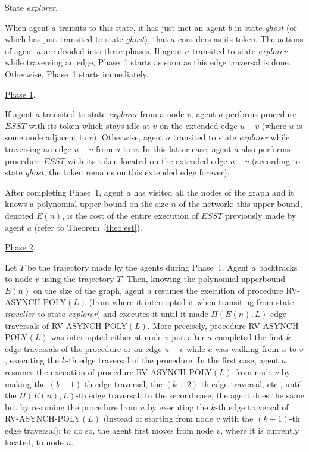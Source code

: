 \documentclass [11pt] {article}
\begin{document}
\noindent
State {\em explorer}.

{When agent $a$ transits to this state, it has just met an agent $b$ in state {\em ghost} (or which has just transited to state {\em ghost}), that $a$ considers as its token.
The actions of agent $a$ are divided into three phases. If agent $a$ transited to state {\em explorer} while traversing an edge, Phase~1 starts as soon as this edge traversal is done. Otherwise, Phase~1 starts immediately.}

\noindent \underline{Phase 1}.

{If agent $a$ transited to state {\em explorer} from a node $v$, agent $a$ performs procedure $ESST$ with its token which stays idle at $v$ on the extended edge $u-v$ (where $u$ is some node adjacent to $v$). Otherwise, agent $a$ transited to state {\em explorer} while traversing an edge $u-v$ from $u$ to $v$. In this latter case, agent $a$ also performs procedure $ESST$ with its token located on the extended edge $u-v$ (according to state {\em ghost}, the token remains on this extended edge forever)}.

{After completing Phase~1, agent $a$ has visited all the nodes of the graph and it knows a polynomial upper bound on the size $n$ of the network: this upper bound, denoted $E(n)$, is the cost of the entire execution of $ESST$ previously made by agent $a$ (refer to Theorem~\ref{theo:est}).} 

\noindent  \underline{Phase 2}.



{Let $T$ be the trajectory made by the agents during Phase~1. Agent $a$ backtracks to node $v$ using the trajectory $\overline{T}$. Then, knowing the polynomial upperbound $E(n)$ on the size of the graph, agent $a$ resumes the execution of procedure RV-ASYNCH-POLY$(L)$ (from where it interrupted it when transiting from state {\em traveller} to state {\em explorer}) and executes it until it made $\Pi(E(n),L)$ edge traversals of RV-ASYNCH-POLY$(L)$. More precisely, procedure RV-ASYNCH-POLY$(L)$ was interrupted either at node $v$ just after $a$ completed the first $k$ edge traversals of the procedure or on edge $u-v$ while $a$ was walking from $u$ to $v$, executing the $k$-th edge traversal of the procedure. In the first case, agent $a$ resumes the execution of procedure RV-ASYNCH-POLY$(L)$ from node $v$ by making the $(k+1)$-th edge traversal, the $(k+2)$-th edge traversal, etc., until the $\Pi(E(n),L)$-th edge traversal. In the second case, the agent does the same but by resuming the procedure from $u$ by executing the $k$-th edge traversal of RV-ASYNCH-POLY$(L)$ (instead of starting from node $v$ with the $(k+1)$-th edge traversal): to do so, the agent first moves from node $v$, where it is currently located, to node $u$.}
\end{document}
